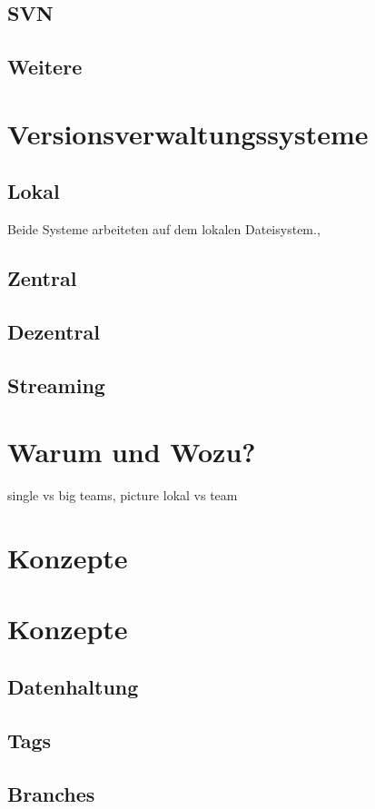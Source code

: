 \subsection{SVN}
\subsection{Weitere}
\section{Versionsverwaltungssysteme}
\subsection{Lokal}
Beide Systeme arbeiteten auf dem lokalen
Dateisystem.,
\subsection{Zentral}
\subsection{Dezentral}
\subsection{Streaming}
\section{Warum und Wozu?}
single vs big teams, picture lokal vs team
\label{sec:why}
\section{Konzepte}
\label{sec:systems}
\section{Konzepte}
\label{sec:Konzepte}
\subsection{Datenhaltung}
\label{sec:Datenhaltung}
\subsection{Tags}
\label{sec:Tags}
\subsection{Branches}
\label{sec:Branches}
